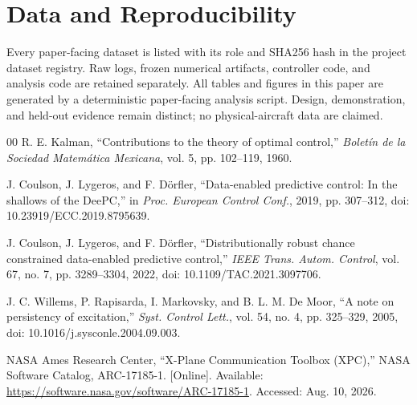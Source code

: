 \documentclass[conference]{IEEEtran}
\begin{document}
\section*{Data and Reproducibility}
Every paper-facing dataset is listed with its role and SHA256 hash in the
project dataset registry. Raw logs, frozen numerical artifacts, controller
code, and analysis code are retained separately. All tables and figures in this
paper are generated by a deterministic paper-facing analysis script. Design,
demonstration, and held-out evidence remain distinct; no physical-aircraft data
are claimed.

\begin{thebibliography}{00}
R. E. Kalman, ``Contributions to the theory of optimal control,'' \emph{Boletín
de la Sociedad Matemática Mexicana}, vol. 5, pp. 102--119, 1960.

J. Coulson, J. Lygeros, and F. Dörfler, ``Data-enabled predictive control: In
the shallows of the DeePC,'' in \emph{Proc. European Control Conf.}, 2019,
pp. 307--312, doi: 10.23919/ECC.2019.8795639.

J. Coulson, J. Lygeros, and F. Dörfler, ``Distributionally robust chance
constrained data-enabled predictive control,'' \emph{IEEE Trans. Autom.
Control}, vol. 67, no. 7, pp. 3289--3304, 2022,
doi: 10.1109/TAC.2021.3097706.

J. C. Willems, P. Rapisarda, I. Markovsky, and B. L. M. De Moor, ``A note on
persistency of excitation,'' \emph{Syst. Control Lett.}, vol. 54, no. 4,
pp. 325--329, 2005, doi: 10.1016/j.sysconle.2004.09.003.

NASA Ames Research Center, ``X-Plane Communication Toolbox (XPC),'' NASA
Software Catalog, ARC-17185-1. [Online]. Available:
\url{https://software.nasa.gov/software/ARC-17185-1}. Accessed: Aug. 10, 2026.
\end{thebibliography}
\end{document}
